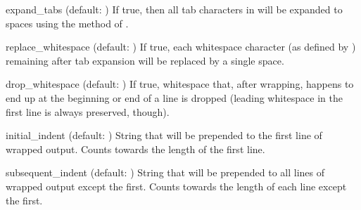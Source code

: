 \begin{memberdesc}{expand_tabs}
(default: ) If true, then all tab characters in 
will be expanded to spaces using the  method of
.
\end{memberdesc}

\begin{memberdesc}{replace_whitespace}
(default: ) If true, each whitespace character (as defined
by ) remaining after tab expansion will be
replaced by a single space.  
\end{memberdesc}

\begin{memberdesc}{drop_whitespace}
(default: ) If true, whitespace that, after wrapping, happens
to end up at the beginning or end of a line is dropped (leading whitespace
in the first line is always preserved, though).
\end{memberdesc}

\begin{memberdesc}{initial_indent}
(default: ) String that will be prepended to the first line
of wrapped output.  Counts towards the length of the first line.
\end{memberdesc}

\begin{memberdesc}{subsequent_indent}
(default: ) String that will be prepended to all lines of
wrapped output except the first.  Counts towards the length of each
line except the first.
\end{memberdesc}

